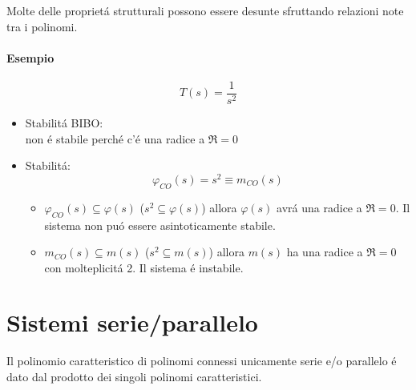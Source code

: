 \documentclass[../main.tex]{subfiles}
\begin{document}
		Molte delle propriet\'a strutturali possono essere desunte sfruttando relazioni note tra i polinomi.
		\paragraph{Esempio}
			\[
				T(s) = \dfrac{1}{s^2}
			\]
			\begin{itemize}
				\item Stabilit\'a BIBO:\\
					non \'e stabile perch\'e c'\'e una radice a $ \Re = 0 $
				\item Stabilit\'a:\\
					\[
						\varphi_{CO}(s) = s^2 \equiv m_{CO}(s)
					\]
					\begin{itemize}
						\item 
							$ \varphi_{CO}(s) \subseteq \varphi(s) $ ($ s^2 \subseteq \varphi(s) $) allora $ \varphi(s) $ avr\'a una radice a $ \Re = 0 $. Il sistema non pu\'o essere asintoticamente stabile.
						\item 
							$ m_{CO}(s) \subseteq m(s) $ ($ s^2 \subseteq m(s) $) allora $ m(s) $ ha una radice a $ \Re = 0 $ con molteplicit\'a 2. Il sistema \'e instabile.
					\end{itemize}
			\end{itemize}
		
	\section{Sistemi serie/parallelo}
		Il polinomio caratteristico di polinomi connessi unicamente serie e/o parallelo \'e dato dal prodotto dei singoli polinomi caratteristici.
\end{document}

